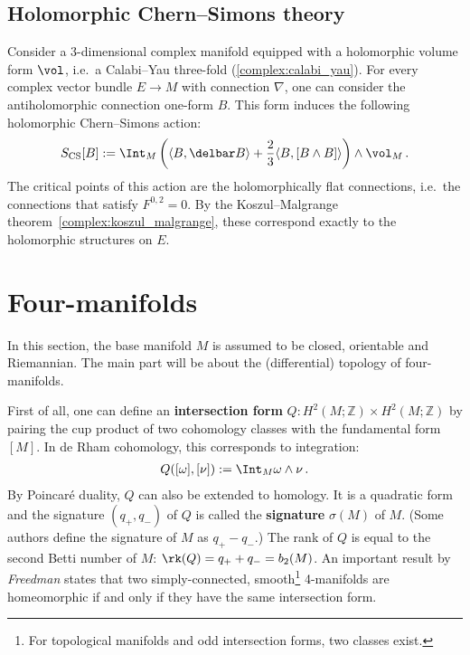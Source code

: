 \subsection{Holomorphic Chern--Simons theory}

    Consider a 3-dimensional complex manifold equipped with a holomorphic volume form $\vol$, i.e.~a Calabi--Yau three-fold (\cref{complex:calabi_yau}). For every complex vector bundle $E\rightarrow M$ with connection $\nabla$, one can consider the antiholomorphic connection one-form $B$. This form induces the following holomorphic Chern--Simons action:
    \begin{gather}
        S_{\text{CS}}[B]:=\Int_M\left(\langle B,\delbar B \rangle+\frac{2}{3}
        \langle B,[B\wedge B] \rangle\right)\wedge\vol_M\,.
    \end{gather}
    The critical points of this action are the holomorphically flat connections, i.e.~the connections that satisfy $F^{0,2}=0$. By the Koszul--Malgrange theorem~\ref{complex:koszul_malgrange}, these correspond exactly to the holomorphic structures on $E$.

\section{Four-manifolds}

    In this section, the base manifold $M$ is assumed to be closed, orientable and Riemannian. The main part will be about the (differential) topology of four-manifolds.

    First of all, one can define an \textbf{intersection form} $Q:H^2(M;\mathbb{Z})\times H^2(M;\mathbb{Z})$ by pairing the cup product of two cohomology classes with the fundamental form $[M]$. In de Rham cohomology, this corresponds to integration:
    \begin{gather}
        Q([\omega],[\nu]) := \Int_M\omega\wedge\nu\,.
    \end{gather}
    By Poincar\'e duality, $Q$ can also be extended to homology. It is a quadratic form and the signature $(q_+,q_-)$ of $Q$ is called the \textbf{signature} $\sigma(M)$ of $M$. (Some authors define the signature of $M$ as $q_+-q_-$.) The rank of $Q$ is equal to the second Betti number of $M$: $\rk(Q)=q_++q_-=b_2(M)$. An important result by \textit{Freedman} states that two simply-connected, smooth\footnote{For topological manifolds and odd intersection forms, two classes exist.} 4-manifolds are homeomorphic if and only if they have the same intersection form.

